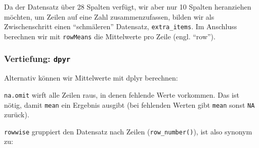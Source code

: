 \documentclass[12pt,ngerman,]{book}
\newenvironment{Shaded}{\begin{snugshade}}{\end{snugshade}}
\newcommand{\KeywordTok}[1]{\textcolor[rgb]{0.13,0.29,0.53}{\textbf{{#1}}}}
\newcommand{\DataTypeTok}[1]{\textcolor[rgb]{0.13,0.29,0.53}{{#1}}}
\newcommand{\StringTok}[1]{\textcolor[rgb]{0.31,0.60,0.02}{{#1}}}
\newcommand{\CommentTok}[1]{\textcolor[rgb]{0.56,0.35,0.01}{\textit{{#1}}}}
\newcommand{\NormalTok}[1]{{#1}}
\renewenvironment{Shaded}{\begin{kframe}}{\end{kframe}}
\begin{document}
Da der Datensatz über 28 Spalten verfügt, wir aber nur 10 Spalten
heranziehen möchten, um Zeilen auf eine Zahl zusammenzufassen, bilden
wir als Zwischenschritt einen ``schmäleren'' Datensatz,
\texttt{extra\_items}. Im Anschluss berechnen wir mit \texttt{rowMeans}
die Mittelwerte pro Zeile (engl. ``row'').

\subsubsection{\texorpdfstring{Vertiefung:
\texttt{dpyr}}{Vertiefung: dpyr}}\label{vertiefung-dpyr}

Alternativ können wir Mittelwerte mit dplyr berechnen:

\begin{Shaded}
\end{Shaded}

\texttt{na.omit} wirft alle Zeilen raus, in denen fehlende Werte
vorkommen. Das ist nötig, damit \texttt{mean} ein Ergebnis ausgibt (bei
fehlenden Werten gibt \texttt{mean} sonst \texttt{NA} zurück).

\texttt{rowwise} gruppiert den Datensatz nach Zeilen
(\texttt{row\_number()}), ist also synonym zu:

\begin{Shaded}
\end{Shaded}
\end{document}
